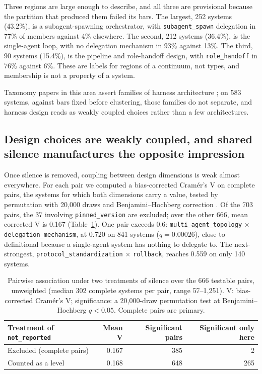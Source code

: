 Three regions are large enough to describe, and all three are provisional because the partition that
produced them failed its bars. The largest, 252 systems (43.2\%), is a subagent-spawning orchestrator,
with \texttt{subagent\_spawn} delegation in 77\% of members against 4\% elsewhere. The second, 212
systems (36.4\%), is the single-agent loop, with no delegation mechanism in 93\% against 13\%. The
third, 90 systems (15.4\%), is the pipeline and role-handoff design, with \texttt{role\_handoff} in 76\%
against 6\%. These are labels for regions of a continuum, not types, and membership is not a property
of a system.

Taxonomy papers in this area assert families of harness architecture
\citep{meng2026harnesssurvey,li2026harnessengineering,twodim2026agentpatterns}; on 583 systems, against
bars fixed before clustering, those families do not separate, and harness design reads as weakly coupled
choices rather than a few architectures.

\subsection{Design choices are weakly coupled, and shared silence manufactures the opposite impression}
\label{subsec:associations}

Once silence is removed, coupling between design dimensions is weak almost everywhere. For each pair we
computed a bias-corrected Cram\'er's V \citep{cramer1946methods,bergsma2013cramersv} on complete pairs,
the systems for which both dimensions carry a value, tested by permutation with 20,000 draws and
Benjamini--Hochberg correction \citep{benjamini1995fdr}. Of the 703 pairs, the 37 involving
\texttt{pinned\_version} are excluded; over the other 666, mean corrected V is 0.167
(Table~\ref{tab:landscape_assoc}). One pair exceeds 0.6: \texttt{multi\_agent\_topology} $\times$
\texttt{delegation\_mechanism}, at 0.720 on 841 systems ($q = 0.00026$), close to definitional because a
single-agent system has nothing to delegate to. The next-strongest, \texttt{protocol\_standardization}
$\times$ \texttt{rollback}, reaches 0.559 on only 140 systems.

\begin{table}[tbp]
\caption{Pairwise association under two treatments of silence over the 666 testable pairs, unweighted
(median 302 complete systems per pair, range 57--1,251). V: bias-corrected Cram\'er's V; significance: a
20,000-draw permutation test at Benjamini--Hochberg $q < 0.05$. Complete pairs are primary.}
\label{tab:landscape_assoc}
\footnotesize
\begin{tabular}{lrrr}
\toprule
Treatment of \texttt{not\_reported} & Mean V & Significant pairs & Significant only here \\
\midrule
Excluded (complete pairs)    & 0.167 & 385 & 2 \\
Counted as a level           & 0.168 & 648 & 265 \\
\bottomrule
\end{tabular}
\end{table}

